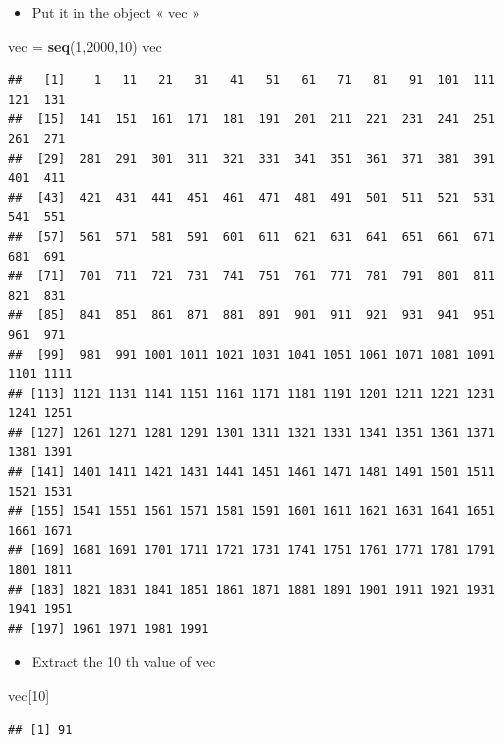 \documentclass[]{article}
\newenvironment{Shaded}{\begin{snugshade}}{\end{snugshade}}
\newcommand{\KeywordTok}[1]{\textcolor[rgb]{0.13,0.29,0.53}{\textbf{#1}}}
\newcommand{\DecValTok}[1]{\textcolor[rgb]{0.00,0.00,0.81}{#1}}
\newcommand{\StringTok}[1]{\textcolor[rgb]{0.31,0.60,0.02}{#1}}
\newcommand{\NormalTok}[1]{#1}
\providecommand{\tightlist}{%
  \setlength{\itemsep}{0pt}\setlength{\parskip}{0pt}}
\begin{document}
\begin{enumerate}
  \begin{itemize}
  \tightlist
  \item
    Put it in the object « vec »
  \end{itemize}

\begin{Shaded}
\begin{Highlighting}[]
\NormalTok{vec =}\StringTok{ }\KeywordTok{seq}\NormalTok{(}\DecValTok{1}\NormalTok{,}\DecValTok{2000}\NormalTok{,}\DecValTok{10}\NormalTok{)}
\NormalTok{vec}
\end{Highlighting}
\end{Shaded}

\begin{verbatim}
##   [1]    1   11   21   31   41   51   61   71   81   91  101  111  121  131
##  [15]  141  151  161  171  181  191  201  211  221  231  241  251  261  271
##  [29]  281  291  301  311  321  331  341  351  361  371  381  391  401  411
##  [43]  421  431  441  451  461  471  481  491  501  511  521  531  541  551
##  [57]  561  571  581  591  601  611  621  631  641  651  661  671  681  691
##  [71]  701  711  721  731  741  751  761  771  781  791  801  811  821  831
##  [85]  841  851  861  871  881  891  901  911  921  931  941  951  961  971
##  [99]  981  991 1001 1011 1021 1031 1041 1051 1061 1071 1081 1091 1101 1111
## [113] 1121 1131 1141 1151 1161 1171 1181 1191 1201 1211 1221 1231 1241 1251
## [127] 1261 1271 1281 1291 1301 1311 1321 1331 1341 1351 1361 1371 1381 1391
## [141] 1401 1411 1421 1431 1441 1451 1461 1471 1481 1491 1501 1511 1521 1531
## [155] 1541 1551 1561 1571 1581 1591 1601 1611 1621 1631 1641 1651 1661 1671
## [169] 1681 1691 1701 1711 1721 1731 1741 1751 1761 1771 1781 1791 1801 1811
## [183] 1821 1831 1841 1851 1861 1871 1881 1891 1901 1911 1921 1931 1941 1951
## [197] 1961 1971 1981 1991
\end{verbatim}

  \begin{itemize}
  \tightlist
  \item
    Extract the 10 th value of vec
  \end{itemize}

\begin{Shaded}
\begin{Highlighting}[]
\NormalTok{vec[}\DecValTok{10}\NormalTok{]}
\end{Highlighting}
\end{Shaded}

\begin{verbatim}
## [1] 91
\end{verbatim}


\end{enumerate}
\end{document}
